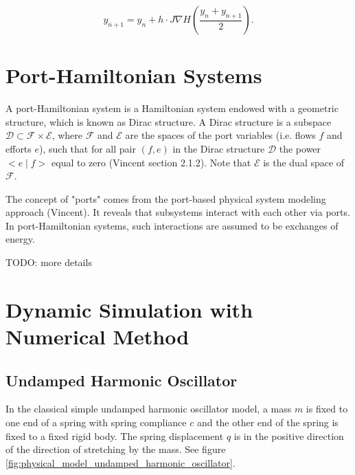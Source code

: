 \documentclass[
	parskip, 			   %
	twoside, 			   %
	DIV=14, 			   %
	BCOR=15.0mm, 		   %
	headsepline, 		   %
	open=right, 		   %
	captions=tableheading, %
	bibliography=totoc,    %
	numbers=noenddot       %
]{scrreprt}
\begin{document}
\begin{equation}
    \label{eq:Midpoint_rule_implicit_Hamiltonian}
    y_{n+1} = y_{n} + h \cdot J \nabla H (\frac{y_{n} + y_{n+1}}{2}).
\end{equation}

\section{Port-Hamiltonian Systems}
A port-Hamiltonian system is a Hamiltonian system endowed with a geometric structure, which is known as Dirac structure. A Dirac structure is a subspace $\mathcal{D} \subset \mathcal{F} \times \mathcal{E}$, where $\mathcal{F}$ and $\mathcal{E}$ are the spaces of the port variables (i.e. flows $f$ and efforts $e$), such that for all pair $(f,e)$ in the Dirac structure $\mathcal{D}$ the power $<e \mid f>$ equal to zero (Vincent section 2.1.2). Note that $\mathcal{E}$ is the dual space of $\mathcal{F}$.

The concept of "ports" comes from the port-based physical system modeling approach (Vincent). It reveals that subsystems interact with each other via ports. In port-Hamiltonian systems, such interactions are assumed to be exchanges of energy.


TODO: more details
\section{Dynamic Simulation with Numerical Method}
\subsection{Undamped Harmonic Oscillator}
In the classical simple undamped harmonic oscillator model, a mass $m$ is fixed to one end of a spring with spring compliance $c$ and the other end of the spring is fixed to a fixed rigid body. The spring displacement $q$ is in the positive direction of the direction of stretching by the mass. See figure \ref{fig:physical_model_undamped_harmonic_oscillator}.
\end{document}
